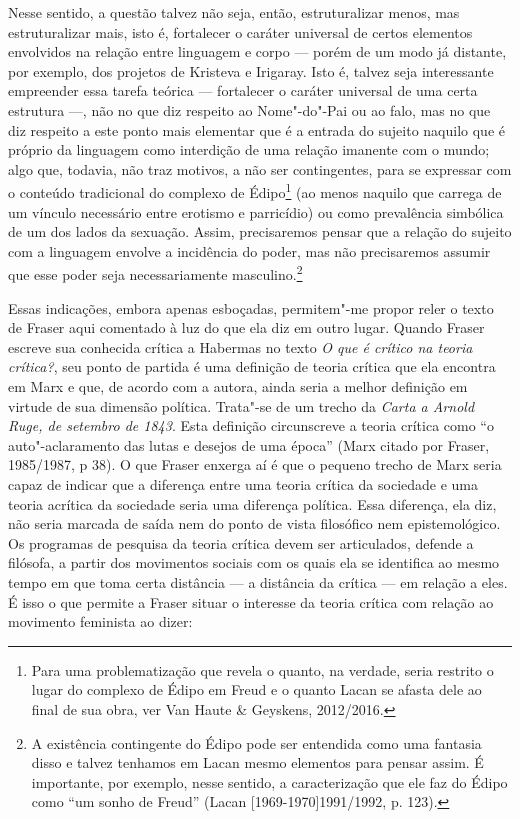 Nesse sentido, a questão talvez não seja, então, estruturalizar menos,
mas estruturalizar mais, isto é, fortalecer o caráter universal de
certos elementos envolvidos na relação entre linguagem e corpo --- porém
de um modo já distante, por exemplo, dos projetos de Kristeva e
Irigaray. Isto é, talvez seja interessante empreender essa tarefa
teórica --- fortalecer o caráter universal de uma certa estrutura ---, não
no que diz respeito ao Nome"-do"-Pai ou ao falo, mas no que diz respeito a
este ponto mais elementar que é a entrada do sujeito naquilo que é
próprio da linguagem como interdição de uma relação imanente com o
mundo; algo que, todavia, não traz motivos, a não ser contingentes, para
se expressar com o conteúdo tradicional do complexo de Édipo\footnote{Para
  uma problematização que revela o quanto, na verdade, seria restrito o
  lugar do complexo de Édipo em Freud e o quanto Lacan se afasta dele ao
  final de sua obra, ver Van Haute \& Geyskens, 2012/2016.} (ao menos
naquilo que carrega de um vínculo necessário entre erotismo e
parricídio) ou como prevalência simbólica de um dos lados da sexuação.
Assim, precisaremos pensar que a relação do sujeito com a linguagem
envolve a incidência do poder, mas não precisaremos assumir que esse
poder seja necessariamente masculino.\footnote{A existência contingente
  do Édipo pode ser entendida como uma fantasia disso e talvez tenhamos
  em Lacan mesmo elementos para pensar assim. É importante, por exemplo,
  nesse sentido, a caracterização que ele faz do Édipo como ``um sonho
  de Freud'' (Lacan {[}1969-1970{]}1991/1992, p. 123).}

Essas indicações, embora apenas esboçadas, permitem"-me propor reler o
texto de Fraser aqui comentado à luz do que ela diz em outro lugar.
Quando Fraser escreve sua conhecida crítica a Habermas no texto \emph{O
que é crítico na teoria crítica?}, seu ponto de partida é uma definição
de teoria crítica que ela encontra em Marx e que, de acordo com a
autora, ainda seria a melhor definição em virtude de sua dimensão
política. Trata"-se de um trecho da \emph{Carta a Arnold Ruge, de
setembro de 1843}. Esta definição circunscreve a teoria crítica como ``o
auto"-aclaramento das lutas e desejos de uma época'' (Marx citado por
Fraser, 1985/1987, p 38). O que Fraser enxerga aí é que o pequeno trecho
de Marx seria capaz de indicar que a diferença entre uma teoria crítica
da sociedade e uma teoria acrítica da sociedade seria uma diferença
política. Essa diferença, ela diz, não seria marcada de saída nem do
ponto de vista filosófico nem epistemológico. Os programas de pesquisa
da teoria crítica devem ser articulados, defende a filósofa, a partir
dos movimentos sociais com os quais ela se identifica ao mesmo tempo em
que toma certa distância --- a distância da crítica --- em relação a eles.
É isso o que permite a Fraser situar o interesse da teoria crítica com
relação ao movimento feminista ao dizer:

